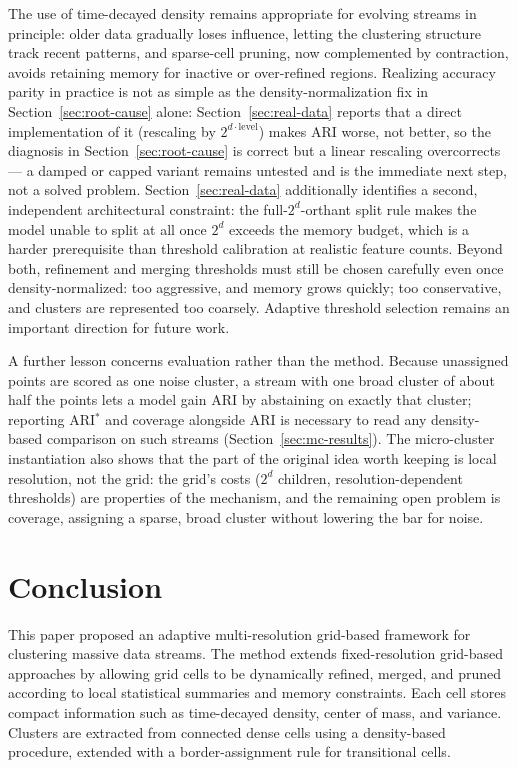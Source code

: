\documentclass[11pt]{article}
\begin{document}
The use of time-decayed density remains appropriate for evolving streams in principle: older data gradually loses influence, letting the clustering structure track recent patterns, and sparse-cell pruning, now complemented by contraction, avoids retaining memory for inactive or over-refined regions. Realizing accuracy parity in practice is not as simple as the density-normalization fix in Section~\ref{sec:root-cause} alone: Section~\ref{sec:real-data} reports that a direct implementation of it (rescaling by \(2^{d\cdot\text{level}}\)) makes ARI worse, not better, so the diagnosis in Section~\ref{sec:root-cause} is correct but a linear rescaling overcorrects — a damped or capped variant remains untested and is the immediate next step, not a solved problem. Section~\ref{sec:real-data} additionally identifies a second, independent architectural constraint: the full-\(2^d\)-orthant split rule makes the model unable to split at all once \(2^d\) exceeds the memory budget, which is a harder prerequisite than threshold calibration at realistic feature counts. Beyond both, refinement and merging thresholds must still be chosen carefully even once density-normalized: too aggressive, and memory grows quickly; too conservative, and clusters are represented too coarsely. Adaptive threshold selection remains an important direction for future work.

A further lesson concerns evaluation rather than the method. Because unassigned points are scored as one noise cluster, a stream with one broad cluster of about half the points lets a model gain ARI by abstaining on exactly that cluster; reporting ARI$^*$ and coverage alongside ARI is necessary to read any density-based comparison on such streams (Section~\ref{sec:mc-results}). The micro-cluster instantiation also shows that the part of the original idea worth keeping is local resolution, not the grid: the grid's costs ($2^d$ children, resolution-dependent thresholds) are properties of the mechanism, and the remaining open problem is coverage, assigning a sparse, broad cluster without lowering the bar for noise.

\section{Conclusion}

This paper proposed an adaptive multi-resolution grid-based framework for clustering massive data streams. The method extends fixed-resolution grid-based approaches by allowing grid cells to be dynamically refined, merged, and pruned according to local statistical summaries and memory constraints. Each cell stores compact information such as time-decayed density, center of mass, and variance. Clusters are extracted from connected dense cells using a density-based procedure, extended with a border-assignment rule for transitional cells.
\end{document}
